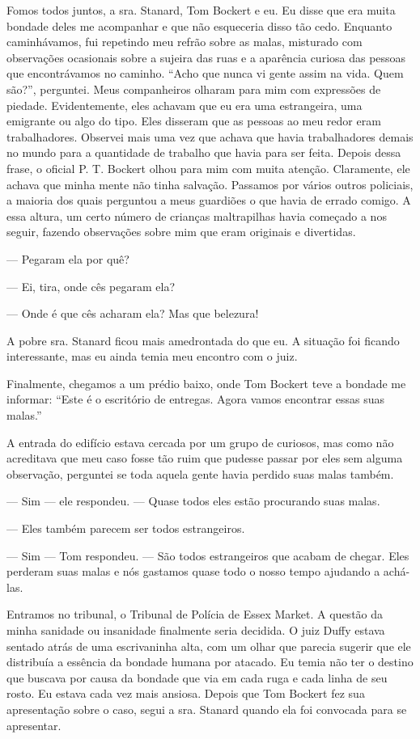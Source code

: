 Fomos todos juntos, a sra. Stanard, Tom Bockert e eu. Eu disse que era
muita bondade deles me acompanhar e que não esqueceria disso tão cedo.
Enquanto caminhávamos, fui repetindo meu refrão sobre as malas,
misturado com observações ocasionais sobre a sujeira das ruas e a
aparência curiosa das pessoas que encontrávamos no caminho. 
``Acho que nunca vi gente assim na vida. Quem são?'', perguntei. Meus
companheiros olharam para mim com expressões de piedade. Evidentemente,
eles achavam que eu era uma estrangeira, uma emigrante ou algo do tipo.
Eles disseram que as pessoas ao meu redor eram trabalhadores. Observei
mais uma vez que achava que havia trabalhadores demais no mundo para a
quantidade de trabalho que havia para ser feita. Depois dessa frase, o
oficial P. T. Bockert olhou para mim com muita atenção. Claramente, ele
achava que minha mente não tinha salvação. Passamos por vários outros
policiais, a maioria dos quais perguntou a meus guardiões o que havia de
errado comigo. A essa altura, um certo número de crianças maltrapilhas
havia começado a nos seguir, fazendo observações sobre mim que eram
originais e divertidas.

--- Pegaram ela por quê? 

--- Ei, tira, onde cês pegaram ela? 

--- Onde é que cês acharam ela? Mas que belezura!

A pobre sra. Stanard ficou mais amedrontada do que eu. A situação foi
ficando interessante, mas eu ainda temia meu encontro com o juiz.

Finalmente, chegamos a um prédio baixo, onde Tom Bockert teve a bondade
me informar: ``Este é o escritório de entregas. Agora vamos encontrar
essas suas malas.''

A entrada do edifício estava cercada por um grupo de curiosos, mas como
não acreditava que meu caso fosse tão ruim que pudesse passar por eles
sem alguma observação, perguntei se toda aquela gente havia perdido suas
malas também.

--- Sim --- ele respondeu. --- Quase todos eles estão procurando suas
malas.

--- Eles também parecem ser todos estrangeiros. 

--- Sim --- Tom
respondeu. --- São todos estrangeiros que acabam de chegar. Eles
perderam suas malas e nós gastamos quase todo o nosso tempo ajudando a
achá-las.

Entramos no tribunal, o Tribunal de Polícia de Essex Market. A questão
da minha sanidade ou insanidade finalmente seria decidida. O juiz Duffy
estava sentado atrás de uma escrivaninha alta, com um olhar que parecia
sugerir que ele distribuía a essência da bondade humana por atacado. Eu
temia não ter o destino que buscava por causa da bondade que via em cada
ruga e cada linha de seu rosto. Eu estava cada vez mais ansiosa. Depois
que Tom Bockert fez sua apresentação sobre o caso, segui a sra. Stanard
quando ela foi convocada para se apresentar.

